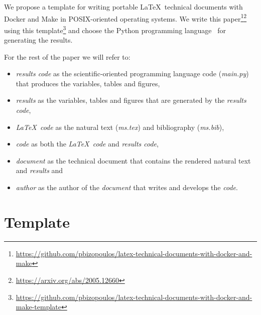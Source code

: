 \documentclass[journal]{IEEEtran}
\begin{document}
We propose a template for writing portable \LaTeX\ technical documents with Docker and Make in POSIX-oriented operating systems.
We write this paper\footnote{\url{https://github.com/pbizopoulos/latex-technical-documents-with-docker-and-make}}\footnote{\url{https://arxiv.org/abs/2005.12660}} using this template\footnote{\url{https://github.com/pbizopoulos/latex-technical-documents-with-docker-and-make-template}} and choose the Python programming language~\cite{van2007python} for generating the results.

For the rest of the paper we will refer to:
\begin{itemize}
	\item \textit{results code} as the scientific-oriented programming language code (\textit{main.py}) that produces the variables, tables and figures,
	\item \textit{results} as the variables, tables and figures that are generated by the \textit{results code},
	\item \textit{\LaTeX\ code} as the natural text (\textit{ms.tex}) and bibliography (\textit{ms.bib}),
	\item \textit{code} as both the \textit{\LaTeX\ code} and \textit{results code},
	\item \textit{document} as the technical document that contains the rendered natural text and \textit{results} and
	\item \textit{author} as the author of the \textit{document} that writes and develops the \textit{code}.
\end{itemize}

\section{Template}
\end{document}
